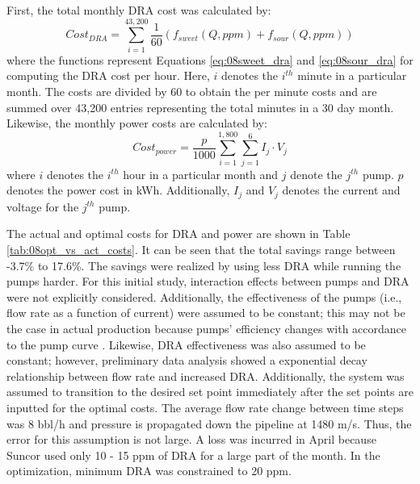 First, the total monthly DRA cost was calculated by:
\begin{equation}
    Cost_{DRA} = \sum\limits^{43,200}_{i=1} \frac{1}{60} \left(f_{sweet}(Q, ppm) + f_{sour}(Q, ppm)\right)
    \label{eq:08dra_cost}
\end{equation}
where the functions represent Equations \ref{eq:08sweet_dra} and \ref{eq:08sour_dra} for computing the DRA cost per hour. Here, $i$ denotes the $i^{th}$ minute in a particular month. The costs are divided by 60 to obtain the per minute costs and are summed over 43,200 entries representing the total minutes in a 30 day month. Likewise, the monthly power costs are calculated by:
\begin{equation}
    Cost_{power} = \frac{p}{1000} \sum\limits^{1,800}_{i=1} \sum\limits^{6}_{j=1} I_j \cdot V_j
    \label{eq:08power_cost}
\end{equation}
where $i$ denotes the $i^{th}$ hour in a particular month and $j$ denote the $j^{th}$ pump. $p$ denotes the power cost in kWh. Additionally, $I_j$ and $V_j$ denotes the current and voltage for the $j^{th}$ pump.

The actual and optimal costs for DRA and power are shown in Table \ref{tab:08opt_vs_act_costs}.  It can be seen that the total savings range between -3.7\% to 17.6\%.  The savings were realized by using less DRA while running the pumps harder. For this initial study, interaction effects between pumps and DRA were not explicitly considered. Additionally, the effectiveness of the pumps (i.e., flow rate as a function of current) were assumed to be constant; this may not be the case in actual production because pumps' efficiency changes with accordance to the pump curve \cite{fluid_mechanics}. Likewise, DRA effectiveness was also assumed to be constant; however, preliminary data analysis showed a exponential decay relationship between flow rate and increased DRA.  Additionally, the system was assumed to transition to the desired set point immediately after the set points are inputted for the optimal costs. The average flow rate change between time steps was 8 bbl/h and pressure is propagated down the pipeline at 1480 m/s.  Thus, the error for this assumption is not large. A loss was incurred in April because Suncor used only 10 - 15 ppm of DRA for a large part of the month. In the optimization, minimum DRA was constrained to 20 ppm.

